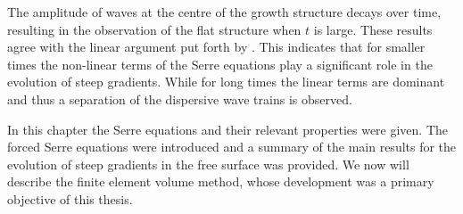 The amplitude of waves at the centre of the growth structure decays over time, resulting in the observation of the flat structure when $t$ is large. These results agree with the linear argument put forth by \citet{Dougalis-etal-2007}. This indicates that for smaller times the non-linear terms of the Serre equations play a significant role in the evolution of steep gradients. While for long times the linear terms are dominant and thus a separation of the dispersive wave trains is observed. 

\medskip

In this chapter the Serre equations and their relevant properties were given. The forced Serre equations were introduced and a summary of the main results for the evolution of steep gradients in the free surface was provided. We now will describe the finite element volume method, whose development was a primary objective of this thesis. 
